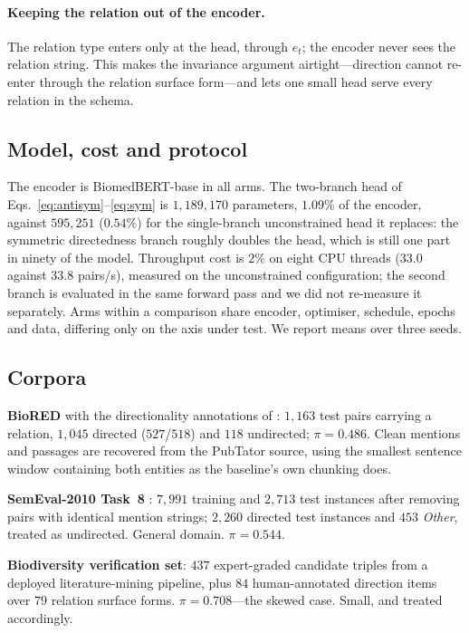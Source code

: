 \documentclass[11pt]{article}
\begin{document}
\paragraph{Keeping the relation out of the encoder.}
The relation type enters only at the head, through $e_t$; the encoder never sees the relation
string. This makes the invariance argument airtight---direction cannot re-enter through the
relation surface form---and lets one small head serve every relation in the schema.

\subsection{Model, cost and protocol}
\label{sec:method-cost}
The encoder is BiomedBERT-base \citep{gu2021domain} in all arms. The two-branch head of
Eqs.~\ref{eq:antisym}--\ref{eq:sym} is $1{,}189{,}170$ parameters, $1.09\%$ of the encoder,
against $595{,}251$ ($0.54\%$) for the single-branch unconstrained head it replaces: the symmetric
directedness branch roughly doubles the head, which is still one part in ninety of the model.
Throughput cost is $2\%$ on eight CPU threads ($33.0$ against $33.8$ pairs/s), measured on the
unconstrained configuration; the second branch is evaluated in the same forward pass and we did
not re-measure it separately. Arms within a comparison share encoder, optimiser, schedule, epochs
and data, differing only on the axis under test. We report means over three seeds.

\subsection{Corpora}
\label{sec:method-data}
\textbf{BioRED} \citep{luo2022biored} with the directionality annotations of
\citet{lai2025directionality}: $1{,}163$ test pairs carrying a relation, $1{,}045$ directed
($527$/$518$) and $118$ undirected; $\pi = 0.486$. Clean mentions and passages are recovered
from the PubTator source, using the smallest sentence window containing both entities as the
baseline's own chunking does.

\textbf{SemEval-2010 Task~8} \citep{hendrickx2010semeval}: $7{,}991$ training and $2{,}713$
test instances after removing pairs with identical mention strings; $2{,}260$ directed test
instances and $453$ \emph{Other}, treated as undirected. General domain. $\pi = 0.544$.

\textbf{Biodiversity verification set}: $437$ expert-graded candidate triples from a deployed
literature-mining pipeline, plus $84$ human-annotated direction items over $79$ relation
surface forms. $\pi = 0.708$---the skewed case. Small, and treated accordingly.
\end{document}
